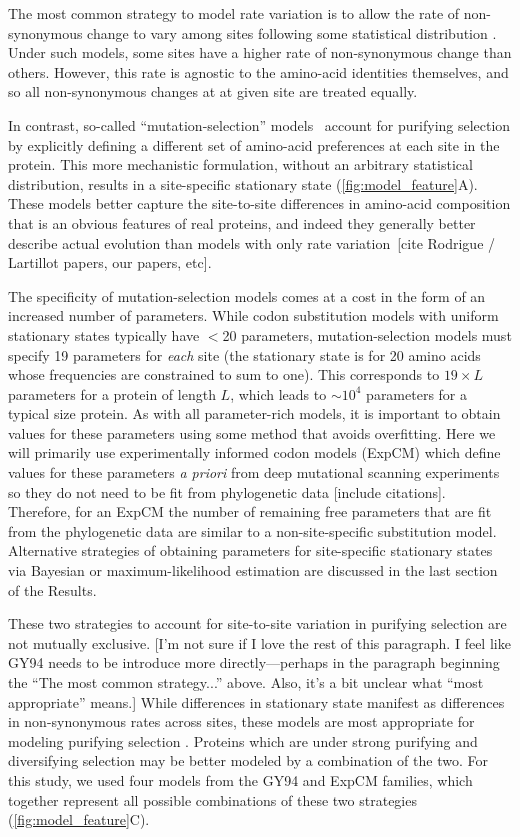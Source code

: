 \documentclass[11pt]{article}
\newcommand\jdbcomment[1]{{\color{red}[#1]}}
\begin{document}
The most common strategy to model rate variation is to allow the rate of non-synonymous change to vary among sites following some statistical distribution \citep[\ref{fig:model_feature}B;][]{yang1994maximum, yang2000codon}. 
Under such models, some sites have a higher rate of non-synonymous change than others. 
However, this rate is agnostic to the amino-acid identities themselves, and so all non-synonymous changes at at given site are treated equally. 

In contrast, so-called ``mutation-selection'' models~\citep{halpern1998evolutionary} account for purifying selection by explicitly defining a different set of amino-acid preferences at each site in the protein. 
This more mechanistic formulation, without an arbitrary statistical distribution, results in a site-specific stationary state (\ref{fig:model_feature}A). 
These models better capture the site-to-site differences in amino-acid composition that is an obvious features of real proteins, and indeed they generally better describe actual evolution than models with only rate variation~\jdbcomment{cite Rodrigue / Lartillot papers, our papers, etc}.

The specificity of mutation-selection models comes at a cost in the form of an increased number of parameters. 
While codon substitution models with uniform stationary states typically have $<$20 parameters, mutation-selection models must specify 19 parameters for \emph{each} site (the stationary state is for 20 amino acids whose frequencies are constrained to sum to one).
This corresponds to $19\times L$ parameters for a protein of length $L$, which leads to $\sim 10^4$ parameters for a typical size protein.
As with all parameter-rich models, it is important to obtain values for these parameters using some method that avoids overfitting.
Here we will primarily use experimentally informed codon models (ExpCM) which define values for these parameters \textit{a priori} from deep mutational scanning experiments so they do not need to be fit from phylogenetic data \jdbcomment{include citations}.
Therefore, for an ExpCM the number of remaining free parameters that are fit from the phylogenetic data are similar to a non-site-specific substitution model.
Alternative strategies of obtaining parameters for site-specific stationary states via Bayesian or maximum-likelihood estimation are discussed in the last section of the Results.

These two strategies to account for site-to-site variation in purifying selection are not mutually exclusive. 
\jdbcomment{I'm not sure if I love the rest of this paragraph. I feel like GY94 needs to be introduce more directly---perhaps in the paragraph beginning the ``The most common strategy...'' above. Also, it's a bit unclear what ``most appropriate'' means.}
While differences in stationary state manifest as differences in non-synonymous rates across sites, these models are most appropriate for modeling purifying selection \citep{spielman2015relationship}.
Proteins which are under strong purifying and diversifying selection may be better modeled by a combination of the two. 
For this study, we used four models from the GY94 and ExpCM families, which together represent all possible combinations of these two strategies (\ref{fig:model_feature}C). 
\end{document}
